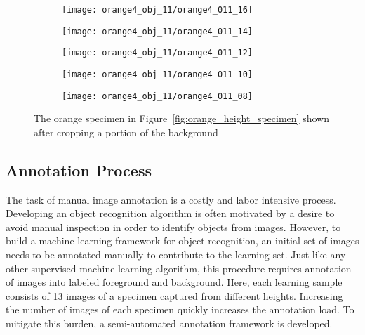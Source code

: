\begin{figure*}
\begin{subfigure}[]{0.12\textwidth}
      \caption{}
  \end{subfigure}
  \begin{subfigure}[]{0.12\textwidth}
      \texttt{[image: orange4\_obj\_11/orange4\_011\_16]}
      \caption{}
  \end{subfigure}
  \begin{subfigure}[]{0.12\textwidth}
      \texttt{[image: orange4\_obj\_11/orange4\_011\_14]}
      \caption{}
  \end{subfigure}
  \begin{subfigure}[]{0.12\textwidth}
      \texttt{[image: orange4\_obj\_11/orange4\_011\_12]}
      \caption{}
  \end{subfigure}
  \begin{subfigure}[]{0.12\textwidth}
      \texttt{[image: orange4\_obj\_11/orange4\_011\_10]}
      \caption{}
  \end{subfigure}
  \begin{subfigure}[]{0.12\textwidth}
      \texttt{[image: orange4\_obj\_11/orange4\_011\_08]}
      \caption{}
  \end{subfigure}
\caption[Images of an orange specimen after cropping a portion of background]{The orange specimen in Figure~\ref{fig:orange_height_specimen} shown after cropping a portion of the background}
\label{fig:orange_height_specimen_cropped}
\end{figure*}	


\subsection{Annotation Process}
\label{sec:distdes_annotation}

The task of manual image annotation is a costly and labor intensive process. Developing an object recognition algorithm is often motivated by a desire to avoid manual inspection in order to identify objects from images. However, to build a machine learning framework for object recognition, an initial set of images needs to be annotated manually to contribute to the learning set. 
Just like any other supervised machine learning algorithm, this procedure requires annotation of images into labeled foreground and background. Here, each learning sample consists of 13 images of a specimen captured from different heights. Increasing the number of images of each specimen quickly increases the annotation load. To mitigate this burden, a semi-automated annotation framework is developed.

